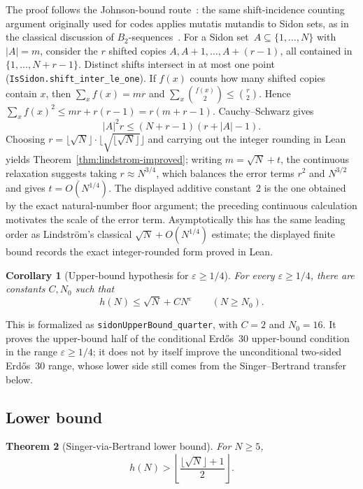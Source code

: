 \documentclass[11pt,a4paper]{article}
\newtheorem{theorem}{Theorem}[section]
\newtheorem{corollary}[theorem]{Corollary}
\begin{document}
\noindent The proof follows the Johnson-bound route~\cite{Johnson1962}: the
same shift-incidence counting argument originally used for codes applies
mutatis mutandis to Sidon sets, as in the classical discussion of
\(B_2\)-sequences~\cite[\S C9]{Guy2004}.  For a Sidon set~$A\subseteq\{1,\dots,N\}$
with \(|A|=m\), consider the \(r\) shifted copies
\(A,A+1,\dots,A+(r-1)\), all contained in \(\{1,\dots,N+r-1\}\).
Distinct shifts intersect in at most one point
(\texttt{IsSidon.shift\_inter\_le\_one}).  If \(f(x)\) counts how many shifted
copies contain \(x\), then
\(\sum_x f(x)=mr\) and
\(\sum_x \binom{f(x)}2\le \binom r2\).  Hence
\(\sum_x f(x)^2\le mr+r(r-1)=r(m+r-1)\).  Cauchy--Schwarz gives
\[
  |A|^2 r \le (N+r-1)(r+|A|-1).
\]
Choosing
\(r=\lfloor\sqrt{N}\rfloor\cdot
\lfloor\sqrt{\lfloor\sqrt{N}\rfloor}\rfloor\) and carrying out the integer
rounding in Lean yields Theorem~\ref{thm:lindstrom-improved}; writing
\(m=\sqrt N+t\), the continuous relaxation suggests taking
\(r\approx N^{3/4}\), which balances the error terms \(r^2\) and \(N^{3/2}\)
and gives \(t=O(N^{1/4})\).  The displayed additive constant~$2$ is the one
obtained by the exact natural-number floor argument; the preceding continuous
calculation motivates the scale of the error term.
Asymptotically this has the same leading order as Lindstr\"om's classical
$\sqrt{N}+O(N^{1/4})$ estimate; the displayed finite bound records the exact
integer-rounded form proved in Lean.

\begin{corollary}[Upper-bound hypothesis for $\varepsilon \ge 1/4$]
\label{cor:upper-quarter}
For every $\varepsilon\ge1/4$, there are constants $C,N_0$ such that
\[
  h(N)\le \sqrt{N}+C N^\varepsilon \qquad (N\ge N_0).
\]
\end{corollary}

\noindent This is formalized as \texttt{sidonUpperBound\_quarter}, with
$C=2$ and $N_0=16$.  It proves the upper-bound half of the conditional
Erd\H{o}s~30 upper-bound condition in the range $\varepsilon\ge1/4$; it does not by
itself improve the unconditional two-sided Erd\H{o}s~30 range, whose lower
side still comes from the Singer--Bertrand transfer below.

\subsection{Lower bound}

\begin{theorem}[Singer-via-Bertrand lower bound]
\label{thm:lower-bound}
For $N \ge 5$,
\[
  h(N) > \left\lfloor\frac{\lfloor\sqrt{N}\rfloor+1}{2}\right\rfloor .
\]
\end{theorem}
\end{document}
